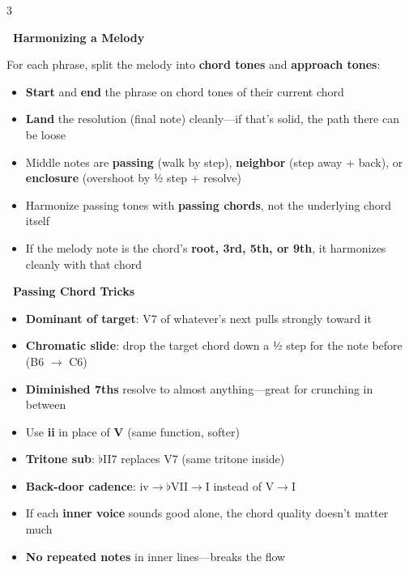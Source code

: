 \documentclass[letterpaper]{article}
\newcommand{\sect}[2]{%
  \noindent\begin{minipage}{\linewidth}%
  \colorbox{headerbg}{\color{white}\textbf{\ #1\ }}\par
  \vspace{1mm}
  #2
  \end{minipage}\par\vspace{2.5mm}%
}
\begin{document}
\begin{multicols}{3}
\sect{Harmonizing a Melody}{%
For each phrase, split the melody into \textbf{chord tones} and \textbf{approach tones}:
\begin{itemize}
  \item \textbf{Start} and \textbf{end} the phrase on chord tones of their current chord
  \item \textbf{Land} the resolution (final note) cleanly---if that's solid, the path there can be loose
  \item Middle notes are \textbf{passing} (walk by step), \textbf{neighbor} (step away + back), or \textbf{enclosure} (overshoot by ½ step + resolve)
  \item Harmonize passing tones with \textbf{passing chords}, not the underlying chord itself
  \item If the melody note is the chord's \textbf{root, 3rd, 5th, or 9th}, it harmonizes cleanly with that chord
\end{itemize}%
}

\sect{Passing Chord Tricks}{%
\begin{itemize}
  \item \textbf{Dominant of target}: V7 of whatever's next pulls strongly toward it
  \item \textbf{Chromatic slide}: drop the target chord down a ½ step for the note before (B6 \(\to\) C6)
  \item \textbf{Diminished 7ths} resolve to almost anything---great for crunching in between
  \item Use \textbf{ii} in place of \textbf{V} (same function, softer)
  \item \textbf{Tritone sub}: \(\flat\)II7 replaces V7 (same tritone inside)
  \item \textbf{Back-door cadence}: iv\(\to\)\(\flat\)VII\(\to\)I instead of V\(\to\)I
  \item If each \textbf{inner voice} sounds good alone, the chord quality doesn't matter much
  \item \textbf{No repeated notes} in inner lines---breaks the flow
\end{itemize}%
}


\end{multicols}
\end{document}
